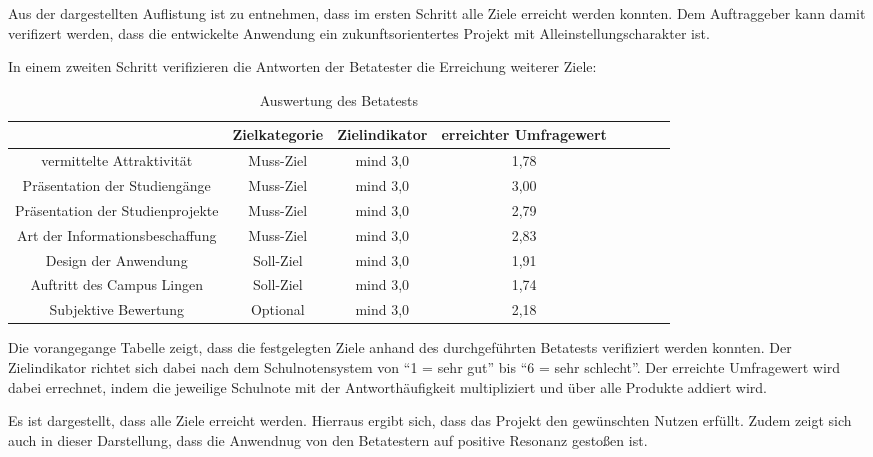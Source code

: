 Aus der dargestellten Auflistung ist zu entnehmen, dass im ersten Schritt alle Ziele erreicht werden konnten.
Dem Auftraggeber kann damit verifizert werden, dass die entwickelte Anwendung ein zukunftsorientertes Projekt mit
Alleinstellungscharakter ist.

In einem zweiten Schritt verifizieren die Antworten der Betatester die Erreichung weiterer Ziele:


\begin{table}[h]
\centering
\begin{tabular}{cccccccl}
\hline
\multicolumn{1}{l}{}              & Zielkategorie  & Zielindikator  & erreichter Umfragewert \\ \hline

vermittelte Attraktivität         & Muss-Ziel      & mind 3,0       & 1,78                    \\ \hline
Präsentation der Studiengänge     & Muss-Ziel      & mind 3,0       & 3,00                    \\ \hline
Präsentation der Studienprojekte  & Muss-Ziel      & mind 3,0       & 2,79                    \\ \hline
Art der Informationsbeschaffung   & Muss-Ziel      & mind 3,0       & 2,83                    \\ \hline
Design der Anwendung              & Soll-Ziel      & mind 3,0       & 1,91                    \\ \hline
Auftritt des Campus Lingen        & Soll-Ziel      & mind 3,0       & 1,74                    \\ \hline

Subjektive Bewertung              & Optional       & mind 3,0       & 2,18                    \\ \hline
\end{tabular}
\caption{Auswertung des Betatests}%
\label{tab:Fragebogen}%
\end{table}

Die vorangegange Tabelle zeigt, dass die festgelegten Ziele anhand des durchgeführten 
Betatests verifiziert werden konnten.
Der Zielindikator richtet sich dabei nach dem Schulnotensystem von "`1 = sehr gut"' bis "`6 = sehr schlecht"'.
Der erreichte Umfragewert wird dabei errechnet, indem die jeweilige Schulnote mit 
der Antworthäufigkeit multipliziert und über alle Produkte addiert wird.

Es ist dargestellt, dass alle Ziele erreicht werden. Hierraus ergibt sich, dass das Projekt 
den gewünschten Nutzen erfüllt.
Zudem zeigt sich auch in dieser Darstellung, dass die Anwendnug von den Betatestern
auf positive Resonanz gestoßen ist.